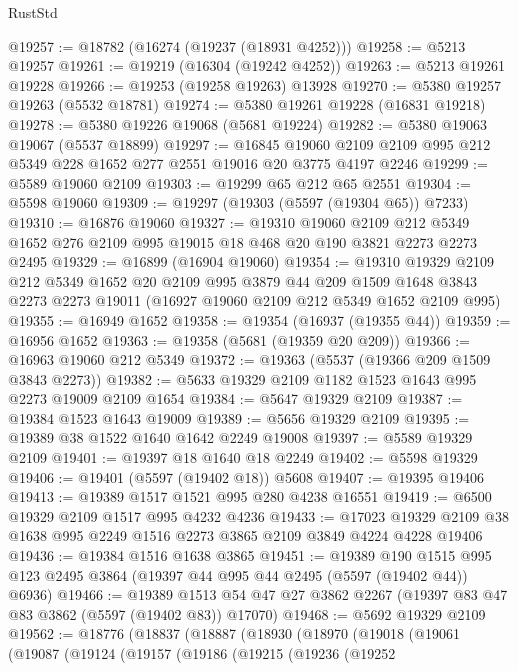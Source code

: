 \begin{lexlean}{RustStd}
\begin{coremodule}
@19257 := @18782 (@16274 (@19237 (@18931 @4252)))
@19258 := @5213 @19257
@19261 := @19219 (@16304 (@19242 @4252))
@19263 := @5213 @19261 @19228
@19266 := @19253 (@19258 @19263) @13928
@19270 := @5380 @19257 @19263 (@5532 @18781)
@19274 := @5380 @19261 @19228 (@16831 @19218)
@19278 := @5380 @19226 @19068 (@5681 @19224)
@19282 := @5380 @19063 @19067 (@5537 @18899)
@19297 := @16845
    @19060
    @2109
    @2109
    @995
    @212
    @5349
    @228
    @1652
    @277
    @2551
    @19016
    @20
    @3775
    @4197
    @2246
@19299 := @5589 @19060 @2109
@19303 := @19299 @65 @212 @65 @2551
@19304 := @5598 @19060
@19309 := @19297 (@19303 (@5597 (@19304 @65)) @7233)
@19310 := @16876 @19060
@19327 := @19310
    @19060
    @2109
    @212
    @5349
    @1652
    @276
    @2109
    @995
    @19015
    @18
    @468
    @20
    @190
    @3821
    @2273
    @2273
    @2495
@19329 := @16899 (@16904 @19060)
@19354 := @19310
    @19329
    @2109
    @212
    @5349
    @1652
    @20
    @2109
    @995
    @3879
    @44
    @209
    @1509
    @1648
    @3843
    @2273
    @2273
    @19011
    (@16927 @19060 @2109 @212 @5349 @1652 @2109 @995)
@19355 := @16949 @1652
@19358 := @19354 (@16937 (@19355 @44))
@19359 := @16956 @1652
@19363 := @19358 (@5681 (@19359 @20 @209))
@19366 := @16963 @19060 @212 @5349
@19372 := @19363 (@5537 (@19366 @209 @1509 @3843 @2273))
@19382 := @5633 @19329 @2109 @1182 @1523 @1643 @995 @2273 @19009 @2109 @1654
@19384 := @5647 @19329 @2109
@19387 := @19384 @1523 @1643 @19009
@19389 := @5656 @19329 @2109
@19395 := @19389 @38 @1522 @1640 @1642 @2249 @19008
@19397 := @5589 @19329 @2109
@19401 := @19397 @18 @1640 @18 @2249
@19402 := @5598 @19329
@19406 := @19401 (@5597 (@19402 @18)) @5608
@19407 := @19395 @19406
@19413 := @19389 @1517 @1521 @995 @280 @4238 @16551
@19419 := @6500 @19329 @2109 @1517 @995 @4232 @4236
@19433 := @17023 @19329 @2109 @38 @1638 @995 @2249 @1516 @2273 @3865 @2109 @3849 @4224 @4228 @19406
@19436 := @19384 @1516 @1638 @3865
@19451 := @19389
    @190
    @1515
    @995
    @123
    @2495
    @3864
    (@19397 @44 @995 @44 @2495 (@5597 (@19402 @44)) @6936)
@19466 := @19389
    @1513
    @54
    @47
    @27
    @3862
    @2267
    (@19397 @83 @47 @83 @3862 (@5597 (@19402 @83)) @17070)
@19468 := @5692 @19329 @2109
@19562 := @18776
    (@18837
      (@18887
        (@18930
          (@18970
            (@19018
              (@19061
                (@19087
                  (@19124
                    (@19157
                      (@19186
                        (@19215
                          (@19236
                            (@19252

\end{coremodule}
\end{lexlean}
